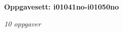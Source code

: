 \centerline{\bf Oppgavesett: i01041no-i01050no}
\vskip 10pt
\centerline{\it 10 oppgaver}\vskip 10pt
\vskip 10pt
